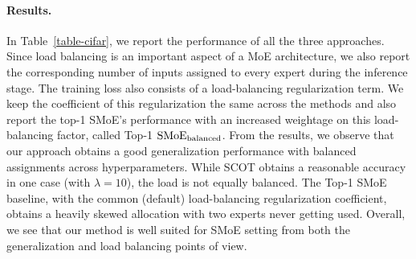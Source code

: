 \paragraph{Results.}
In Table~\ref{table-cifar}, we report the performance of all the three approaches. Since load balancing is an important aspect of a MoE architecture, we also report the corresponding number of inputs assigned to every expert during the inference stage. The training loss also consists of a load-balancing regularization term. We keep the coefficient of this regularization the same across the methods and also report the top-1 SMoE's performance with an increased weightage on this load-balancing factor, called Top-1 $\rm{ SMoE}_{\rm{balanced}}$.
From the results, we observe that our approach obtains a good generalization performance with balanced assignments across hyperparameters. While SCOT obtains a reasonable accuracy in one case (with $\lambda=10$), the load is not equally balanced. 
The Top-1 SMoE baseline, with the common (default) load-balancing regularization coefficient, obtains a heavily skewed allocation with two experts never getting used.
Overall, we see that our method is well suited for SMoE setting from both the generalization and load balancing points of view. 
